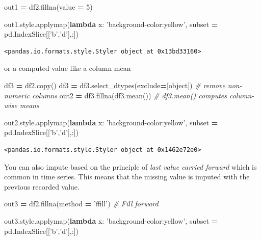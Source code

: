 \documentclass[
  letterpaper,
]{scrbook}
\newenvironment{Shaded}{\begin{snugshade}}{\end{snugshade}}
\newcommand{\BuiltInTok}[1]{#1}
\newcommand{\CommentTok}[1]{\textcolor[rgb]{0.56,0.35,0.01}{\textit{#1}}}
\newcommand{\DecValTok}[1]{\textcolor[rgb]{0.00,0.00,0.81}{#1}}
\newcommand{\KeywordTok}[1]{\textcolor[rgb]{0.13,0.29,0.53}{\textbf{#1}}}
\newcommand{\NormalTok}[1]{#1}
\newcommand{\OperatorTok}[1]{\textcolor[rgb]{0.81,0.36,0.00}{\textbf{#1}}}
\newcommand{\StringTok}[1]{\textcolor[rgb]{0.31,0.60,0.02}{#1}}
\begin{document}
\begin{Shaded}
\begin{Highlighting}[]
\NormalTok{out1 }\OperatorTok{=}\NormalTok{ df2.fillna(value }\OperatorTok{=} \DecValTok{5}\NormalTok{)}

\NormalTok{out1.style.applymap(}\KeywordTok{lambda}\NormalTok{ x: }\StringTok{'background-color:yellow'}\NormalTok{, subset }\OperatorTok{=}\NormalTok{ pd.IndexSlice[[}\StringTok{'b'}\NormalTok{,}\StringTok{'d'}\NormalTok{],:])}
\end{Highlighting}
\end{Shaded}

\begin{verbatim}
<pandas.io.formats.style.Styler object at 0x13bd33160>
\end{verbatim}

or a computed value like a column mean

\begin{Shaded}
\begin{Highlighting}[]
\NormalTok{df3 }\OperatorTok{=}\NormalTok{ df2.copy()}
\NormalTok{df3 }\OperatorTok{=}\NormalTok{ df3.select_dtypes(exclude}\OperatorTok{=}\NormalTok{[}\BuiltInTok{object}\NormalTok{])   }\CommentTok{# remove non-numeric columns}
\NormalTok{out2 }\OperatorTok{=}\NormalTok{ df3.fillna(df3.mean())  }\CommentTok{# df3.mean() computes column-wise means}

\NormalTok{out2.style.applymap(}\KeywordTok{lambda}\NormalTok{ x: }\StringTok{'background-color:yellow'}\NormalTok{, subset }\OperatorTok{=}\NormalTok{ pd.IndexSlice[[}\StringTok{'b'}\NormalTok{,}\StringTok{'d'}\NormalTok{],:])}
\end{Highlighting}
\end{Shaded}

\begin{verbatim}
<pandas.io.formats.style.Styler object at 0x1462e72e0>
\end{verbatim}

You can also impute based on the principle of \emph{last value carried forward} which is common in time series. This means that the missing value is imputed with the previous recorded value.

\begin{Shaded}
\begin{Highlighting}[]
\NormalTok{out3 }\OperatorTok{=}\NormalTok{ df2.fillna(method }\OperatorTok{=} \StringTok{'ffill'}\NormalTok{) }\CommentTok{# Fill forward}

\NormalTok{out3.style.applymap(}\KeywordTok{lambda}\NormalTok{ x: }\StringTok{'background-color:yellow'}\NormalTok{, subset }\OperatorTok{=}\NormalTok{ pd.IndexSlice[[}\StringTok{'b'}\NormalTok{,}\StringTok{'d'}\NormalTok{],:])}
\end{Highlighting}
\end{Shaded}
\end{document}
